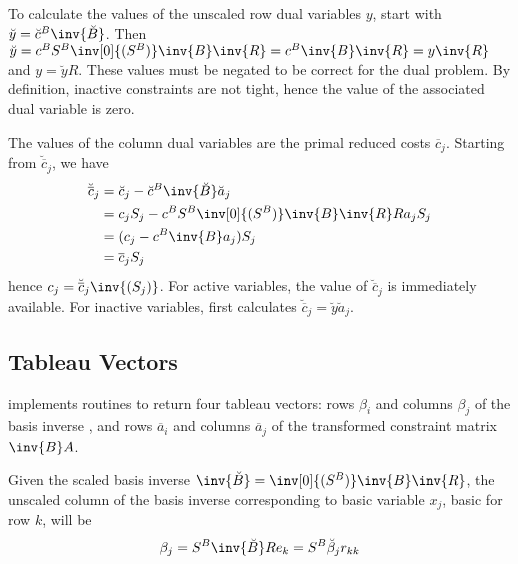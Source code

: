 To calculate the values of the unscaled row dual variables $y$, start with
$\breve{y} = \breve{c}^B \inv{\breve{B}}$.
Then
$\breve{y} = c^B S^B \inv[0]{(S^B)} \inv{B} \inv{R} = c^B \inv{B} \inv{R} =
y \inv{R}$
and
$y = \breve{y} R$.
These values must be negated to be correct for the dual problem.
By definition, inactive constraints are not tight, hence the value of the
associated dual variable is zero.

The values of the column dual variables are the primal reduced costs
$\overline{c}_j$.
Starting from $\breve{\overline{c}}_j$, we have
\begin{align*}
\breve{\overline{c}}_j &
    = \breve{c}_j - \breve{c}^B \inv{\breve{B}}\breve{a}_j \\
  & = c_j S_j - c^B S^B \inv[0]{(S^B)}\inv{B}\inv{R} R a_j S_j \\
  & = (c_j - c^B \inv{B} a_j) S_j \\
  & = \overline{c}_j S_j
\end{align*}
hence $c_j = \breve{\overline{c}}_j\inv{(S_j)}$.
For active variables, the value of $\breve{\overline{c}}_j$ is immediately
available.
For inactive variables, \dylp first calculates $\breve{\overline{c}}_j =
\breve{y}\breve{a}_j$.

\subsection{Tableau Vectors}
\label{sec:TableauVectors}

\Dylp implements routines to return four tableau vectors: rows $\beta_i$ and
columns $\beta_j$ of the basis inverse , and rows $\overline{a}_i$ and
columns $\overline{a}_j$ of the transformed constraint matrix $\inv{B}A$.

Given the scaled basis inverse
$\inv{\breve{B}} = \inv[0]{(S^B)}\inv{B}\inv{R}$, the unscaled column of the
basis inverse corresponding to basic variable $x_j$, basic for row $k$,
will be
\begin{equation} \label{eqn:unscaledBetaj}
\beta_j =  S^B \inv{\breve{B}} R e_k = S^B \breve{\beta}_j r_{kk}
\end{equation}

